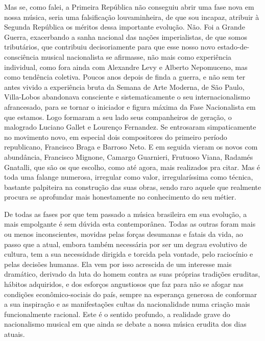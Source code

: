 Mas se, como falei, a Primeira República não conseguiu abrir uma fase
nova em nossa música, seria uma falsificação louvaminheira, de que sou
incapaz, atribuir à Segunda República os méritos dessa importante
evolução. Não. Foi a Grande Guerra, exacerbando a sanha nacional das
nações imperialistas, de que somos tributários, que contribuiu
decisoriamente para que esse nosso novo estado-de-consciência musical
nacionalista se afirmasse, não mais como experiência individual, como
fora ainda com Alexandre Levy e Alberto Nepomuceno, mas como tendência
coletiva. Poucos anos depois de finda a guerra, e não sem ter antes
vivido a experiência bruta da Semana de Arte Moderna, de São Paulo,
Villa-Lobos abandonava consciente e sistematicamente o seu
internacionalismo afrancesado, para se tornar o iniciador e figura
máxima da Fase Nacionalista em que estamos. Logo formaram a seu lado
seus companheiros de geração, o malogrado Luciano Gallet e Lourenço
Fernandez. Se entrosaram simpaticamente no movimento novo, em especial
dois compositores do primeiro período republicano, Francisco Braga e
Barroso Neto. E em seguida vieram os novos com abundância, Francisco
Mignone, Camargo Guarnieri, Frutuoso Viana, Radamés Gnatalli, que são os
que escolho, como até agora, mais realizados pra citar. Mas é toda uma
falange numerosa, irregular como valor, irregularíssima como técnica,
bastante palpiteira na construção das suas obras, sendo raro aquele que
realmente procura se aprofundar mais honestamente no conhecimento do seu
métier.

De todas as fases por que tem passado a música brasileira em sua
evolução, a mais empolgante é sem dúvida esta contemporânea. Todas as
outras foram mais ou menos inconscientes, movidas pelas forças desumanas
e fatais da vida, ao passo que a atual, embora também necessária por ser
um degrau evolutivo de cultura, tem a sua necessidade dirigida e torcida
pela vontade, pelo raciocínio e pelas decisões humanas. Ela vem por isso
acrescida de um interesse mais dramático, derivado da luta do homem
contra as suas próprias tradições eruditas, hábitos adquiridos, e dos
esforços angustiosos que faz para não se afogar nas condições
econômico-sociais do país, sempre na esperança generosa de conformar a
sua inspiração e as manifestações cultas da nacionalidade numa criação
mais funcionalmente racional. Este é o sentido profundo, a realidade
grave do nacionalismo musical em que ainda se debate a nossa música
erudita dos dias atuais.

